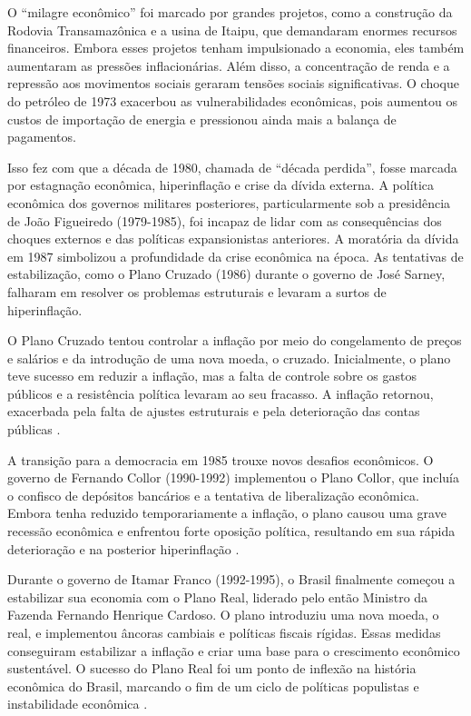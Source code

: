 \documentclass[12pt,oneside,a4paper,chapter=TITLE,english,brazil,sumario=abnt-6027-2012]{abntex2}
\begin{document}
O ``milagre econômico'' foi marcado por grandes projetos, como a construção da Rodovia Transamazônica e a usina de Itaipu, que demandaram enormes recursos financeiros. Embora esses projetos tenham impulsionado a economia, eles também aumentaram as pressões inflacionárias. Além disso, a concentração de renda e a repressão aos movimentos sociais geraram tensões sociais significativas. O choque do petróleo de 1973 exacerbou as vulnerabilidades econômicas, pois aumentou os custos de importação de energia e pressionou ainda mais a balança de pagamentos.

Isso fez com que a década de 1980, chamada de ``década perdida'', fosse marcada por estagnação econômica, hiperinflação e crise da dívida externa. A política econômica dos governos militares posteriores, particularmente sob a presidência de João Figueiredo (1979-1985), foi incapaz de lidar com as consequências dos choques externos e das políticas expansionistas anteriores. A moratória da dívida em 1987 simbolizou a profundidade da crise econômica \cite{fabiogiambiagi_2016_economia} na época. As tentativas de estabilização, como o Plano Cruzado (1986) durante o governo de José Sarney, falharam em resolver os problemas estruturais e levaram a surtos de hiperinflação.

O Plano Cruzado tentou controlar a inflação por meio do congelamento de preços e salários e da introdução de uma nova moeda, o cruzado. Inicialmente, o plano teve sucesso em reduzir a inflação, mas a falta de controle sobre os gastos públicos e a resistência política levaram ao seu fracasso. A inflação retornou, exacerbada pela falta de ajustes estruturais e pela deterioração das contas públicas \cite{fabiogiambiagi_1999_a}.

A transição para a democracia em 1985 trouxe novos desafios econômicos. O governo de Fernando Collor (1990-1992) implementou o Plano Collor, que incluía o confisco de depósitos bancários e a tentativa de liberalização econômica. Embora tenha reduzido temporariamente a inflação, o plano causou uma grave recessão econômica e enfrentou forte oposição política, resultando em sua rápida deterioração e na posterior hiperinflação \cite{lacerda_2010_economia}.

Durante o governo de Itamar Franco (1992-1995), o Brasil finalmente começou a estabilizar sua economia com o Plano Real, liderado pelo então Ministro da Fazenda Fernando Henrique Cardoso. O plano introduziu uma nova moeda, o real, e implementou âncoras cambiais e políticas fiscais rígidas. Essas medidas conseguiram estabilizar a inflação e criar uma base para o crescimento econômico sustentável. O sucesso do Plano Real foi um ponto de inflexão na história econômica do Brasil, marcando o fim de um ciclo de políticas populistas e instabilidade econômica \cite{lacerda_2010_economia}.
\end{document}
